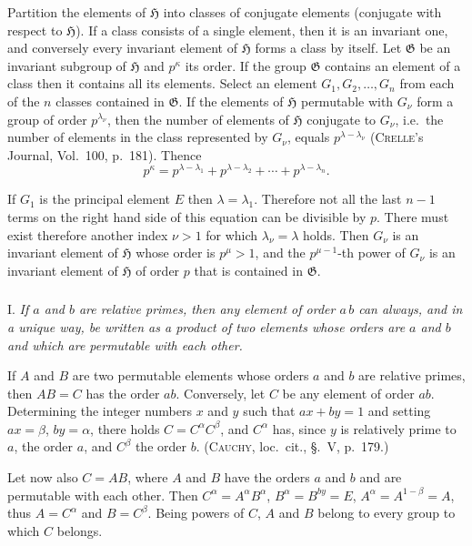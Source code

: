 \documentclass[a5paper,12pt]{article}
\newcommand{\secformat}[1]{\centering{\normalfont\normalsize{#1}}}
\let\fr\mathfrak
\newcommand{\CG}{\fr{G}}
\newcommand{\CH}{\fr{H}}
\newcommand{\?}{{\color{blue}${}^{(?)}$}}
\newcounter{origpagecounter}{}
\newcommand{\origpagebreak}{\mark{\arabic{origpagecounter}}\addtocounter{origpagecounter}{1}\mark{\arabic{origpagecounter}}}
\begin{document}

Partition the elements of $\CH$
into classes of conjugate elements
(conjugate with respect to $\CH$).
%
%
If a class consists of a single element,
then it is an invariant one,
and conversely
every invariant element of $\CH$ forms a class by itself.
%
%
Let $\CG$ be an invariant subgroup of $\CH$
and $p^\kappa$ its order.
%
%
If the group $\CG$ contains an element of a class
then it contains all its elements.
%
%
Select an element $G_1, G_2, \ldots, G_n$
from each of the $n$ classes contained in $\CG$. %
%
%
If the elements of $\CH$ permutable with $G_\nu$
form a group of order $p^{\lambda_\nu}$,
then the number of elements 
of $\CH$ conjugate to $G_\nu$,
i.e.~the number of elements 
in the class represented by $G_\nu$, %
equals $p^{\lambda - \lambda_\nu}$
(\textsc{Crelle}'s Journal, Vol.~100, p.~181).
%
%
Thence
\[
	p^\kappa
	=
	p^{\lambda - \lambda_1}
	+
	p^{\lambda - \lambda_2}
	+
	\cdots
	+
	p^{\lambda - \lambda_n}
	.
\]


If $G_1$ is the principal element $E$
then $\lambda = \lambda_1$.
%
%
Therefore
not all the last $n-1$ terms
on the right hand side of this equation
can be divisible by $p$.
%
%
There must exist therefore another index $\nu > 1$
for which $\lambda_\nu = \lambda$ holds.
%
%
Then $G_\nu$ is an invariant element of $\CH$
whose order is $p^\mu > 1$,
and
the $p^{\mu-1}$-th power of $G_\nu$
is an invariant element of $\CH$ of order $p$
that is contained in $\CG$.


\subsubsection*{\secformat{\S.~2.}}


I.
%
\label{t:2-1}
%
\emph{ %
If $a$ and $b$ are relative primes,
then any element of order $a \, b$
can always, and in a unique way,
be written 
as a product of two elements
whose orders are $a$ and $b$
and
which are permutable with each other.
}


If $A$ and $B$ are two permutable elements
whose orders $a$ and $b$ are relative primes,
then $A B = C$ has the order $a b$.
%
%
Conversely, let $C$ be any element of order $a b$.
%
Determining the integer numbers $x$ and $y$
such that $a x + b y = 1$
and
setting $a x = \beta$, $b y = \alpha$,
there holds $C = C^\alpha C^\beta$,
and $C^\alpha$ has,
since $y$ is relatively prime to $a$,
the order $a$, 
and $C^\beta$ the order $b$.
%
%
(\textsc{Cauchy}, loc.~cit., \S.~V, p.~179.)
%
%
\origpagebreak
%
%
Let now also $C = A B$,
where $A$ and $B$ have the orders $a$ and $b$ 
and are permutable with each other.
%
%
Then
$C^\alpha = A^\alpha B^\alpha$,
$B^\alpha = B^{b y} = E$,
$A^\alpha = A^{1-\beta} = A$,
thus
$A = C^\alpha$ and $B = C^\beta$.
%
%
Being powers of $C$,
$A$ and $B$ belong to every group
to which $C$ belongs.
\end{document}
